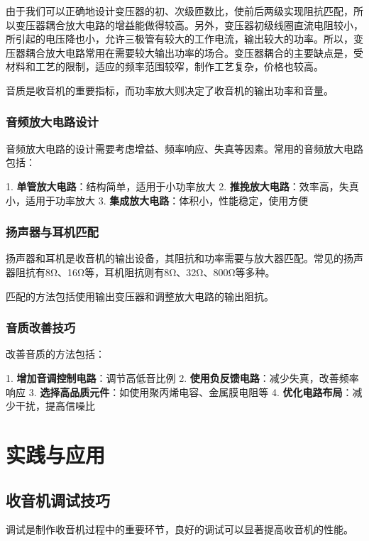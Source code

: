 \documentclass[12pt,UTF8]{ctexbook}
\begin{document}
由于我们可以正确地设计变压器的初、次级匝数比，使前后两级实现阻抗匹配，所以变压器耦合放大电路的增益能做得较高。另外，变压器初级线圈直流电阻较小，所引起的电压降也小，允许三极管有较大的工作电流，输出较大的功率。所以，变压器耦合放大电路常用在需要较大输出功率的场合。变压器耦合的主要缺点是，受材料和工艺的限制，适应的频率范围较窄，制作工艺复杂，价格也较高。

音质是收音机的重要指标，而功率放大则决定了收音机的输出功率和音量。

\section{音频放大电路设计}

音频放大电路的设计需要考虑增益、频率响应、失真等因素。常用的音频放大电路包括：

1. \textbf{单管放大电路}：结构简单，适用于小功率放大
2. \textbf{推挽放大电路}：效率高，失真小，适用于功率放大
3. \textbf{集成放大电路}：体积小，性能稳定，使用方便

\section{扬声器与耳机匹配}

扬声器和耳机是收音机的输出设备，其阻抗和功率需要与放大器匹配。常见的扬声器阻抗有8Ω、16Ω等，耳机阻抗则有8Ω、32Ω、800Ω等多种。

匹配的方法包括使用输出变压器和调整放大电路的输出阻抗。

\section{音质改善技巧}

改善音质的方法包括：

1. \textbf{增加音调控制电路}：调节高低音比例
2. \textbf{使用负反馈电路}：减少失真，改善频率响应
3. \textbf{选择高品质元件}：如使用聚丙烯电容、金属膜电阻等
4. \textbf{优化电路布局}：减少干扰，提高信噪比

\part{实践与应用}

\chapter{收音机调试技巧}

调试是制作收音机过程中的重要环节，良好的调试可以显著提高收音机的性能。
\end{document}
